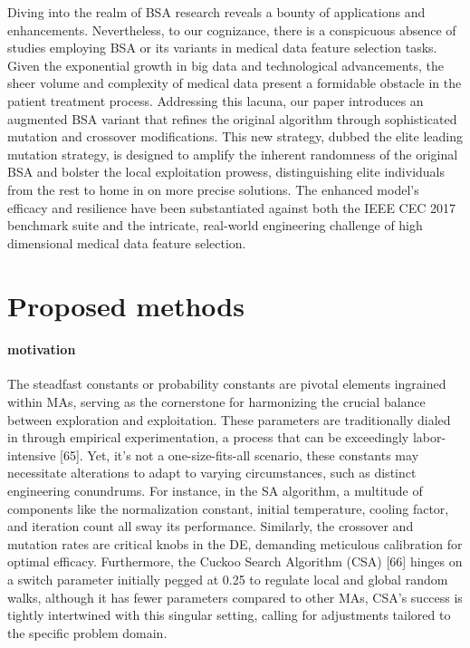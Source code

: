 \documentclass{article} %
\begin{document}
Diving into the realm of BSA research reveals a bounty of applications and enhancements. Nevertheless, to our cognizance, there is a conspicuous absence of studies employing BSA or its variants in medical data feature selection tasks. Given the exponential growth in big data and technological advancements, the sheer volume and complexity of medical data present a formidable obstacle in the patient treatment process. Addressing this lacuna, our paper introduces an augmented BSA variant that refines the original algorithm through sophisticated mutation and crossover modifications. This new strategy, dubbed the elite leading mutation strategy, is designed to amplify the inherent randomness of the original BSA and bolster the local exploitation prowess, distinguishing elite individuals from the rest to home in on more precise solutions. The enhanced model's efficacy and resilience have been substantiated against both the IEEE CEC 2017 benchmark suite and the intricate, real-world engineering challenge of high dimensional medical data feature selection.


\section{ Proposed methods}


\paragraph{ motivation}

The steadfast constants or probability constants are pivotal elements ingrained within MAs, serving as the cornerstone for harmonizing the crucial balance between exploration and exploitation. These parameters are traditionally dialed in through empirical experimentation, a process that can be exceedingly labor-intensive [65]. Yet, it's not a one-size-fits-all scenario, these constants may necessitate alterations to adapt to varying circumstances, such as distinct engineering conundrums. For instance, in the SA algorithm, a multitude of components like the normalization constant, initial temperature, cooling factor, and iteration count all sway its performance. Similarly, the crossover and mutation rates are critical knobs in the DE, demanding meticulous calibration for optimal efficacy. Furthermore, the Cuckoo Search Algorithm (CSA) [66] hinges on a switch parameter initially pegged at 0.25 to regulate local and global random walks, although it has fewer parameters compared to other MAs, CSA's success is tightly intertwined with this singular setting, calling for adjustments tailored to the specific problem domain.
\end{document}

